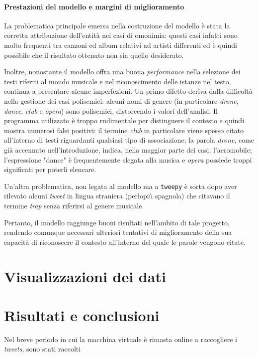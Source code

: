\documentclass[12pt, a4paper, twocolumn]{article} %
\begin{document}
\subsection{Prestazioni del modello e margini di miglioramento}
La problematica principale emersa nella costruzione del modello è stata la corretta attribuzione dell'entità nei casi di omonimia: questi casi infatti sono molto frequenti tra canzoni ed album relativi ad artisti differenti ed è quindi possibile che il risultato ottenuto non sia quello desiderato.

Inoltre, nonostante il modello offra una buona \textit{performance} nella selezione dei testi riferiti al mondo musicale e nel riconoscimento delle istanze nel testo, continua a presentare alcune imperfezioni.
Un primo difetto deriva dalla difficoltà nella gestione dei casi polisemici: alcuni nomi di genere (in particolare \textit{drone}, \textit{dance}, \textit{club} e \textit{opera}) sono polisemici, distorcendo i valori dell'analisi.
Il programma utilizzato è troppo rudimentale per distinguere il contesto e quindi mostra numerosi falsi positivi: il termine \textit{club} in particolare viene spesso citato all'interno di testi riguardanti qualsiasi tipo di associazione; la parola \textit{drone}, come già accennato nell'introduzione, indica, nella maggior parte dei casi, l'aeromobile; l'espressione "dance" è frequentemente slegata alla musica e \textit{opera} possiede troppi significati per poterli elencare.

Un'altra problematica, non legata al modello ma a \verb|tweepy| è sorta dopo aver rilevato alcuni \textit{tweet} in lingua straniera (perlopiù spagnola) che citavano il termine \textit{trap} senza riferirsi al genere musicale.

Pertanto, il modello raggiunge buoni risultati nell'ambito di tale progetto, rendendo comunque necessari ulteriori tentativi di miglioramento della sua capacità di riconoscere il contesto all'interno del quale le parole vengono citate.

\hfill
\newpage
\part{Visualizzazioni dei dati}


\hfill
\newpage
\part{Risultati e conclusioni}
Nel breve periodo in cui la macchina virtuale è rimasta online a raccogliere i \textit{tweets}, sono stati raccolti 




\hfill
\newpage
\printbibliography[title={Bibliografia e sitografia}]

\end{document}
